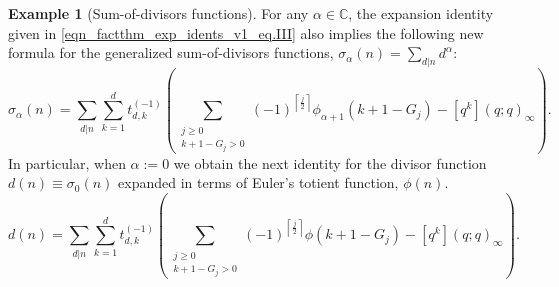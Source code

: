 \documentclass[12pt,reqno,a4letter]{article}
\numberwithin{figure}{section}
\numberwithin{table}{section}
\numberwithin{equation}{section}
\newcommand{\ceiling}[1]{\left\lceil #1 \right\rceil}
\theoremstyle{plain}
\numberwithin{theorem}{section}
\theoremstyle{definition}
\newtheorem{example}[theorem]{Example}
\begin{document}
\begin{example}[Sum-of-divisors functions] 
For any $\alpha \in \mathbb{C}$, the expansion identity given in 
\eqref{eqn_factthm_exp_idents_v1_eq.III} also implies the following new formula for the 
generalized sum-of-divisors functions, $\sigma_{\alpha}(n) = \sum_{d|n} d^{\alpha}$: 
\[
\sigma_{\alpha}(n) = \sum_{d|n} \sum_{k=1}^{d} t_{d,k}^{(-1)}\left( 
     \sum_{\substack{j \geq 0 \\ k+1-G_j > 0}} (-1)^{\ceiling{\frac{j}{2}}} 
     \phi_{\alpha+1}(k+1-G_j) - [q^k] (q; q)_{\infty}\right). 
\] 
In particular, when $\alpha := 0$ we obtain the next identity for the divisor function 
$d(n) \equiv \sigma_0(n)$ expanded in terms of Euler's totient function, $\phi(n)$. 
\[
d(n) = \sum_{d|n} \sum_{k=1}^{d} t_{d,k}^{(-1)}\left( 
     \sum_{\substack{j \geq 0 \\ k+1-G_j > 0}} (-1)^{\ceiling{\frac{j}{2}}} 
     \phi(k+1-G_j) - [q^k] (q; q)_{\infty}\right). 
\] 
\end{example} 
\end{document}
